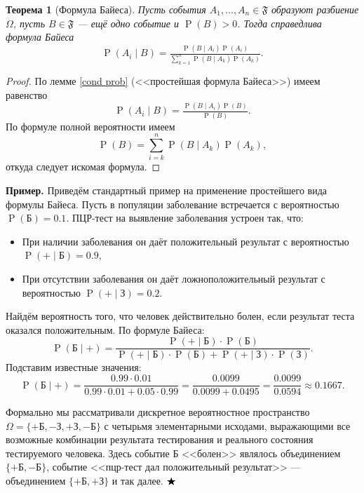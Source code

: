 \documentclass[12pt]{article}
\newtheorem{theorem}{Теорема}
\numberwithin{theorem}{section}
\theoremstyle{definition}
\newenvironment{example}{\indent \textbf{Пример.}}{$ \hfill \bigstar $}
\newcommand{\prob}{\operatorname{P}}
\newcommand{\events}{\mathfrak{F}}
\begin{document}
	\begin{theorem}[Формула Байеса] \label{Bayes}
		Пусть события $ A_1, \ldots, A_n \in \events $ образуют разбиение $ \Omega $,
		пусть $ B \in \events $ --- ещё одно событие и $ \prob(B) > 0 $.
		Тогда справедлива формула Байеса
		$$ \prob(A_i \mid B) = \tfrac{\prob(B \mid A_i)\prob(A_i)}{\sum\limits_{k = 1}^{n} \prob(B \mid A_k)\prob(A_k)}. $$
	\end{theorem}
	
	\begin{proof}
		По лемме \ref{cond prob} (<<простейшая формула Байеса>>) имеем равенство
		$$ \prob(A_i \mid B) = \tfrac{\prob(B \mid A_i)\prob(B)}{\prob(B)}. $$
		По формуле полной вероятности имеем
		$$ \prob(B) = \sum\limits_{i = k}^{n} \prob(B \mid A_k)\prob(A_k), $$
		откуда следует искомая формула.
	\end{proof}
	
	\begin{example}
		Приведём стандартный пример на применение простейшего вида формулы Байеса.
		Пусть в популяции заболевание встречается с вероятностью \( \prob(\text{Б}) = 0.1 \).  
		ПЦР-тест на выявление заболевания устроен так, что:
		\begin{itemize}
			\item При наличии заболевания он даёт положительный результат с вероятностью \( \prob(+ \mid \text{Б}) = 0.9 \),
			\item При отсутствии заболевания он даёт ложноположительный результат с вероятностью 
			\( \prob(+ \mid \text{З}) = 0.2 \).
		\end{itemize}
		Найдём вероятность того, что человек действительно болен, если результат теста оказался положительным.
		По формуле Байеса:
		$$ \prob(\text{Б} \mid +) 
		= \frac{\prob(+ \mid \text{Б})\cdot \prob(\text{Б})}
		{\prob(+ \mid \text{Б})\cdot \prob(\text{Б}) + \prob(+ \mid \text{З})\cdot \prob(\text{З})}.
		$$
		Подставим известные значения:
		$$
		 \prob(\text{Б} \mid +) = \frac{0.99 \cdot 0.01}
		 {0.99 \cdot 0.01 + 0.05 \cdot 0.99} = \frac{0.0099}{0.0099 + 0.0495} = \frac{0.0099}{0.0594} \approx 0.1667.
		$$
		
		Формально мы рассматривали дискретное вероятностное пространство 
		$ \Omega = \{+\text{Б},-\text{З},+\text{З},-\text{Б}\} $ с четырьмя элементарными исходами,
		выражающими все возможные комбинации результата тестирования и реального состояния тестируемого человека.
		Здесь событие Б <<болен>> являлось объединением $ \{+\text{Б},-\text{Б} \} $,
		событие <<пцр-тест дал положительный результат>> --- объединением $ \{+\text{Б},+\text{З} \} $
		и так далее.
		\end{example}
	
\end{document}
